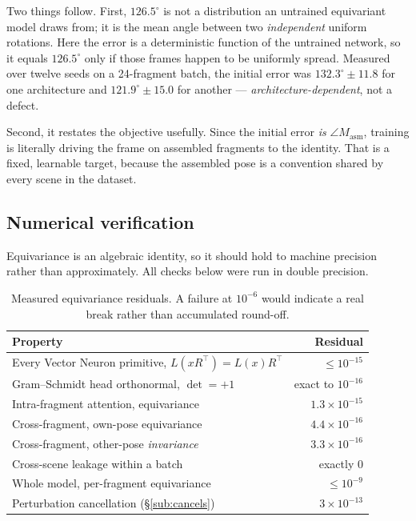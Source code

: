 \documentclass[11pt,a4paper]{report}
\begin{document}
Two things follow. First, $126.5^{\circ}$ is not a distribution an untrained
equivariant model draws from; it is the mean angle between two \emph{independent}
uniform rotations. Here the error is a deterministic function of the untrained
network, so it equals $126.5^{\circ}$ only if those frames happen to be
uniformly spread. Measured over twelve seeds on a 24-fragment batch, the initial
error was $132.3^{\circ}\pm11.8$ for one architecture and $121.9^{\circ}\pm15.0$
for another --- \emph{architecture-dependent}, not a defect.

Second, it restates the objective usefully. Since the initial error \emph{is}
$\angle M_{\text{asm}}$, training is literally driving the frame on assembled
fragments to the identity. That is a fixed, learnable target, because the
assembled pose is a convention shared by every scene in the dataset.

\subsection{Numerical verification}
\label{sub:verification}

Equivariance is an algebraic identity, so it should hold to machine precision
rather than approximately. All checks below were run in double precision.

\begin{table}[h]
\centering
\small
\begin{tabular}{lr}
\toprule
\textbf{Property} & \textbf{Residual} \\
\midrule
Every Vector Neuron primitive, $L(xR^{\top}) = L(x)R^{\top}$ & $\leq 10^{-15}$ \\
Gram--Schmidt head orthonormal, $\det = +1$ & exact to $10^{-16}$ \\
Intra-fragment attention, equivariance & $1.3\times10^{-15}$ \\
Cross-fragment, own-pose equivariance & $4.4\times10^{-16}$ \\
Cross-fragment, other-pose \emph{invariance} & $3.3\times10^{-16}$ \\
Cross-scene leakage within a batch & exactly $0$ \\
Whole model, per-fragment equivariance & $\leq 10^{-9}$ \\
Perturbation cancellation (\S\ref{sub:cancels}) & $3\times10^{-13}$ \\
\bottomrule
\end{tabular}
\caption{Measured equivariance residuals. A failure at $10^{-6}$ would indicate
a real break rather than accumulated round-off.}
\end{table}
\end{document}
